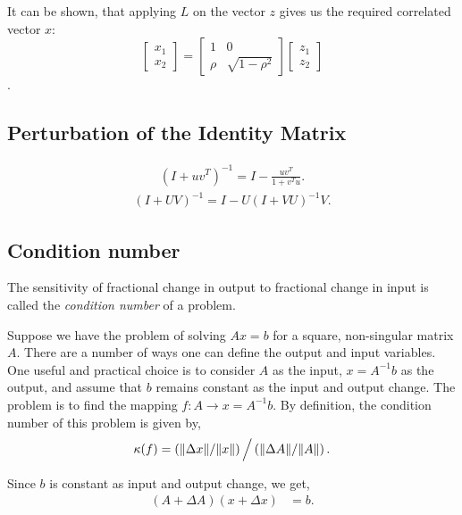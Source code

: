 \documentclass{amsart}
\theoremstyle{plain}
\numberwithin{equation}{section}
\begin{document}
It can be shown, that applying $L$ on the vector $z$
gives us the required correlated vector $x$:
\begin{equation}
\left[
\begin{array}{c}
	  x_1 \\
		x_2 
\end{array}
\right] 
= \left[
\begin{array}{cc}
	1    & 0\\
	\rho & \sqrt{1-\rho^2}
\end{array}
\right]
\left[
\begin{array}{c}
	  z_1 \\
		z_2 
\end{array}
\right]
\label{}
\end{equation}.
\subsection*{Perturbation of the Identity Matrix}
\begin{align*}
\left(I + uv^T\right)^{-1} = I - \frac{uv^T}{1 + v^Tu}.
\end{align*}
\begin{align*}
\left(I + UV\right)^{-1} = I - U(I+VU)^{-1}V.
\end{align*}


\subsection*{Condition number}
The sensitivity of fractional change in output
to fractional change in input is called the \emph{condition number} of 
a problem.

Suppose we have the problem of solving $Ax=b$ for a square, non-singular
matrix $A$. There are a number of
ways one can define the output and input variables. One useful and 
practical choice is to consider $A$ as the input, $x=A^{-1}b$ as the output, and 
assume that $b$ remains constant as the input and output change. 
The problem is to find the mapping $f: A \to x = A^{-1}b$. By definition, the condition
number of this problem is given by,
\begin{align}
\kappa(f) = \left(\|\Delta x\| / \|x\|\right) \Big{/} \left( \| \Delta A\| / \|A\| \right).
\label{eq:cond}
\end{align}

Since $b$ is constant as input and output change, we get,
\begin{align*}
(A+\Delta A) (x + \Delta x) &= b.
\end{align*}
\end{document}
